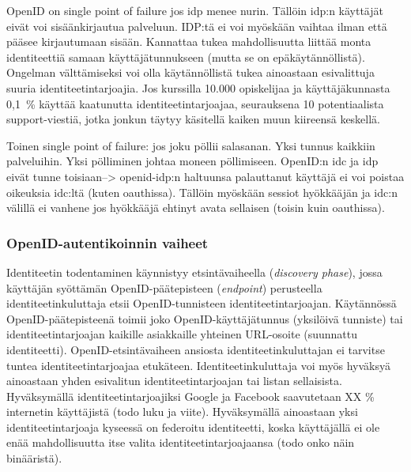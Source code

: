 \documentclass[finnish,gradu]{tktltiki}
\begin{document}

  OpenID on single point of failure jos idp menee nurin. Tällöin idp:n käyttäjät eivät voi sisäänkirjautua palveluun. IDP:tä ei voi myöskään vaihtaa ilman että pääsee kirjautumaan sisään. Kannattaa tukea mahdollisuutta liittää monta identiteettiä samaan käyttäjätunnukseen (mutta se on epäkäytännöllistä). Ongelman välttämiseksi voi olla käytännöllistä tukea ainoastaan esivalittuja suuria identiteetintarjoajia. Jos kurssilla 10.000 opiskelijaa ja käyttäjäkunnasta 0,1~\% käyttää kaatunutta identiteetintarjoajaa, seurauksena 10 potentiaalista support-viestiä, jotka jonkun täytyy käsitellä kaiken muun kiireensä keskellä.

  Toinen single point of failure: jos joku pöllii salasanan. Yksi tunnus kaikkiin palveluihin. Yksi pölliminen johtaa moneen pöllimiseen. OpenID:n idc ja idp eivät tunne toisiaan--> openid-idp:n haltuunsa palauttanut käyttäjä ei voi poistaa oikeuksia idc:ltä (kuten oauthissa). Tällöin myöskään sessiot hyökkääjän ja idc:n välillä ei vanhene jos hyökkääjä ehtinyt avata sellaisen (toisin kuin oauthissa).




  \subsubsection{OpenID-autentikoinnin vaiheet} %
  \label{ssub:openid_autentikoinnin_vaiheet}

  Identiteetin todentaminen käynnistyy etsintävaiheella (\emph{discovery phase}), jossa käyttäjän syöttämän OpenID-päätepisteen (\emph{endpoint}) perusteella identiteetinkuluttaja etsii OpenID-tunnisteen identiteetintarjoajan. Käytännössä OpenID-päätepisteenä toimii joko OpenID-käyttäjätunnus (yksilöivä tunniste) tai identiteetintarjoajan kaikille asiakkaille yhteinen URL-osoite (suunnattu identiteetti). OpenID-etsintävaiheen ansiosta identiteetinkuluttajan ei tarvitse tuntea identiteetintarjoajaa etukäteen. Identiteetinkuluttaja voi myös hyväksyä ainoastaan yhden esivalitun identiteetintarjoajan tai listan sellaisista. Hyväksymällä identiteetintarjoajiksi Google ja Facebook saavutetaan XX \% internetin käyttäjistä (todo luku ja viite). Hyväksymällä ainoastaan yksi identiteetintarjoaja kyseessä on federoitu identiteetti, koska käyttäjällä ei ole enää mahdollisuutta itse valita identiteetintarjoajaansa (todo onko näin binääristä).
\end{document}
